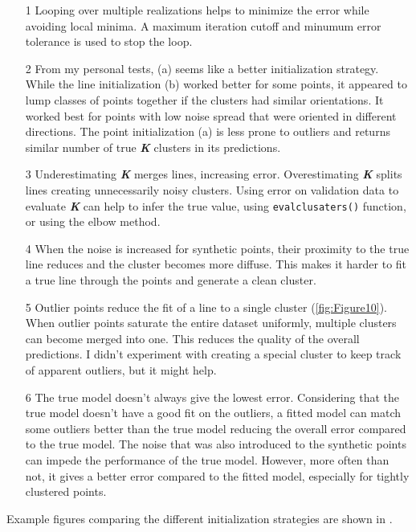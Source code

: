 \documentclass[12pt]{report}
\begin{document}
\begin{enumerate}
    \begin{enumerate}
        \item[1] Looping over multiple realizations helps to minimize the error while avoiding local minima. A maximum iteration cutoff and minumum error tolerance is used to stop 
        the loop.
        \item[2] From my personal tests, (a) seems like a better initialization strategy. While the line initialization (b) worked better for some points, it appeared to lump classes of
        points together if the clusters had similar orientations. It worked best for points with low noise spread that were oriented in different directions. The point initialization 
        (a) is less prone to outliers and returns similar number of true \textbf{\textit{K}} clusters in its predictions.
        \item[3] Underestimating \textbf{\textit{K}} merges lines, increasing error. Overestimating \textbf{\textit{K}} splits lines creating unnecessarily noisy clusters. Using error on 
        validation data to evaluate \textbf{\textit{K}} can help to infer the true value, using \verb|evalclusaters()| function, or using the elbow method.
        \item[4] When the noise is increased for synthetic points, their proximity to the true line reduces and the cluster becomes more diffuse. This makes it harder to fit a true line 
        through the points and generate a clean cluster.
        \item[5] Outlier points reduce the fit of a line to a single cluster (\autoref{fig:Figure10}). When outlier points saturate the entire dataset uniformly, multiple clusters can become 
        merged into one. This reduces the quality of the overall predictions. I didn't experiment with creating a special cluster to keep track of apparent outliers, but it might help.
        \item[6] The true model doesn't always give the lowest error. Considering that the true model doesn't have a good fit on the outliers, a fitted model can match some outliers 
        better than the true model reducing the overall error compared to the true model. The noise that was also introduced to the synthetic points can impede the performance of the true 
        model. However, more often than not, it gives a better error compared to the fitted model, especially for tightly clustered points.
    \end{enumerate}

    Example figures comparing the different initialization strategies are shown in .


\end{enumerate}
\end{document}

